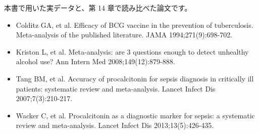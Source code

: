 本書で用いた実データと、第 14 章で読み比べた論文です。

\begin{itemize}
\item Colditz GA, et al. Efficacy of BCG vaccine in the prevention of tuberculosis. Meta-analysis of the published literature. JAMA 1994;271(9):698-702.
\item Kriston L, et al. Meta-analysis: are 3 questions enough to detect unhealthy alcohol use? Ann Intern Med 2008;149(12):879-888.
\item Tang BM, et al. Accuracy of procalcitonin for sepsis diagnosis in critically ill patients: systematic review and meta-analysis. Lancet Infect Dis 2007;7(3):210-217.
\item Wacker C, et al. Procalcitonin as a diagnostic marker for sepsis: a systematic review and meta-analysis. Lancet Infect Dis 2013;13(5):426-435.
\end{itemize}

